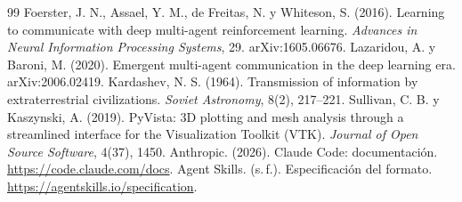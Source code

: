 \documentclass[11pt,a4paper]{article}
\begin{document}
\begin{thebibliography}{99}
 Foerster, J. N., Assael, Y. M., de Freitas, N. y Whiteson, S. (2016). Learning to communicate with deep multi-agent reinforcement learning. \textit{Advances in Neural Information Processing Systems}, 29. arXiv:1605.06676.
 Lazaridou, A. y Baroni, M. (2020). Emergent multi-agent communication in the deep learning era. arXiv:2006.02419.
 Kardashev, N. S. (1964). Transmission of information by extraterrestrial civilizations. \textit{Soviet Astronomy}, 8(2), 217--221.
 Sullivan, C. B. y Kaszynski, A. (2019). PyVista: 3D plotting and mesh analysis through a streamlined interface for the Visualization Toolkit (VTK). \textit{Journal of Open Source Software}, 4(37), 1450.
 Anthropic. (2026). Claude Code: documentaci\'on. \url{https://code.claude.com/docs}.
 Agent Skills. (s.\,f.). Especificaci\'on del formato. \url{https://agentskills.io/specification}.
\end{thebibliography}
\end{document}
